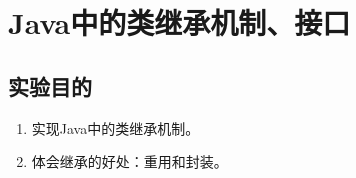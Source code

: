 ﻿\documentclass[cs5size,b5paper,nofonts,twoside]{ctexart}
\begin{document}








\clearpage
\section{Java中的类继承机制、接口}
\subsection{实验目的}
\begin{enumerate}
\item 实现Java中的类继承机制。
\item 体会继承的好处：重用和封装。
\end{enumerate}
\end{document}
